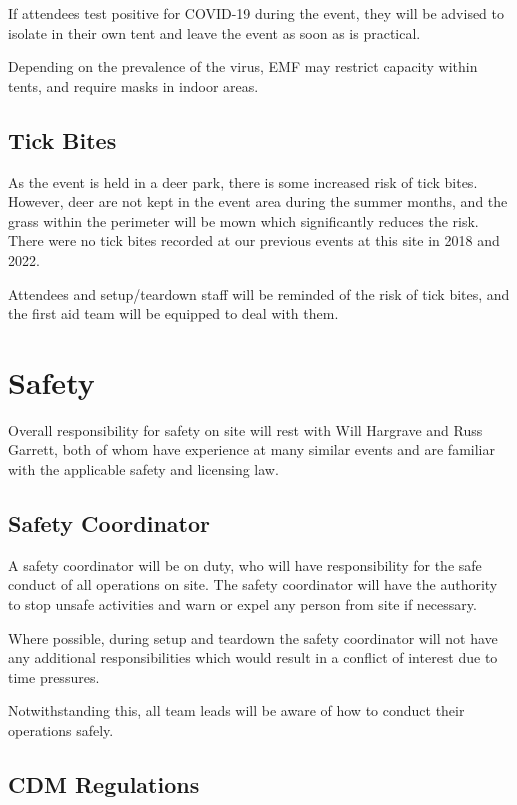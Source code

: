 If attendees test positive for COVID-19 during the event, they will be advised to isolate in
their own tent and leave the event as soon as is practical.

Depending on the prevalence of the virus, EMF may restrict capacity within tents, and
require masks in indoor areas.

\subsection{Tick Bites}

As the event is held in a deer park, there is some increased risk of tick bites. However, deer
are not kept in the event area during the summer months, and the grass within the perimeter
will be mown which significantly reduces the risk. There were no tick bites recorded at our
previous events at this site in 2018 and 2022.

Attendees and setup/teardown staff will be reminded of the risk of tick bites, and the first aid team
will be equipped to deal with them.

\newpage

\section{Safety}\label{safety}

Overall responsibility for safety on site will rest with Will Hargrave and
Russ Garrett, both of whom have experience at many similar events and are
familiar with the applicable safety and licensing law.

\subsection{Safety Coordinator}

A safety coordinator will be on duty, who will have responsibility for the
safe conduct of all operations on site. The safety coordinator will have the
authority to stop unsafe activities and warn or expel any person from site if
necessary.

Where possible, during setup and teardown the safety coordinator will not have
any additional responsibilities which would result in a conflict of interest due
to time pressures.

Notwithstanding this, all team leads will be aware of how to conduct their
operations safely.

\subsection{CDM Regulations}

